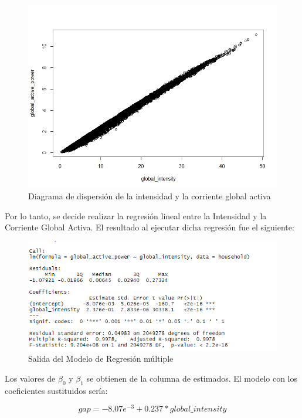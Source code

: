 \documentclass[a4paper,10pt,twocolumn]{report}
\begin{document}
	\begin{figure}[h]
	\centering
	\includegraphics[width=\linewidth]{img/regression/intensity_gap}
	\caption{Diagrama de dispersión de la intensidad y la corriente global activa}
	\label{fig:intensity_gap}
	\end{figure}

	Por lo tanto, se decide realizar la regresión lineal entre la Intensidad y la Corriente Global Activa. El resultado al ejecutar dicha regresión fue el siguiente:
	
	\begin{figure}[H]
		\centering
		\includegraphics[width=1\linewidth]{img/regression/lm}
		\caption{Salida del Modelo de Regresión múltiple}
		\label{fig:lm}
	\end{figure}
	
	Los valores de $\beta_0$ y $\beta_1$ se obtienen de la columna de estimados. El modelo con los coeficientes sustituidos sería:
	
	\begin{equation*}
		gap = -8.07e^{-3} + 0.237*global\_intensity
	\end{equation*}
	
\end{document}
